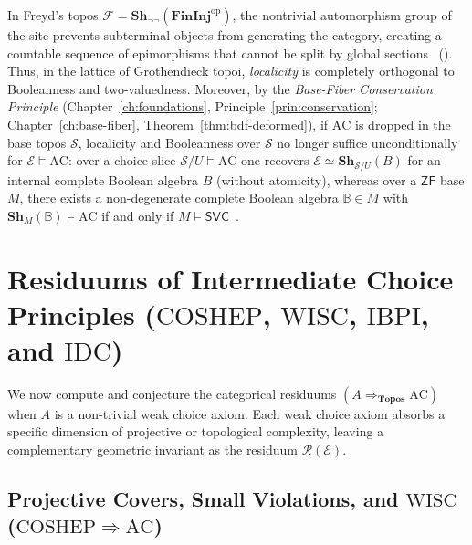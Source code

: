 In Freyd's topos $\mathcal{F} = \mathbf{Sh}_{\neg\neg}(\mathbf{FinInj}^{\mathrm{op}})$, the nontrivial automorphism group of the site prevents subterminal objects from generating the category, creating a countable sequence of epimorphisms that cannot be split by global sections~\cite{Freyd72} (\cite[\S D4.5]{Johnstone02}). Thus, in the lattice of Grothendieck topoi, \emph{localicity} is completely orthogonal to Booleanness and two-valuedness. Moreover, by the \emph{Base-Fiber Conservation Principle} (Chapter~\ref{ch:foundations}, Principle~\ref{prin:conservation}; Chapter~\ref{ch:base-fiber}, Theorem~\ref{thm:bdf-deformed}), if $\mathrm{AC}$ is dropped in the base topos $\mathcal{S}$, localicity and Booleanness over $\mathcal{S}$ no longer suffice unconditionally for $\mathcal{E} \models \mathrm{AC}$: over a choice slice $\mathcal{S}/U \models \mathrm{AC}$ one recovers $\mathcal{E} \simeq \mathbf{Sh}_{\mathcal{S}/U}(B)$ for an internal complete Boolean algebra $B$ (without atomicity), whereas over a $\mathsf{ZF}$ base $M$, there exists a non-degenerate complete Boolean algebra $\mathbb{B} \in M$ with $\mathbf{Sh}_M(\mathbb{B}) \models \mathrm{AC}$ if and only if $M \models \mathsf{SVC}$~\cite{Blass79,Usuba21}.

\section{Residuums of Intermediate Choice Principles ($\mathrm{COSHEP}$, $\mathrm{WISC}$, $\mathrm{IBPI}$, and $\mathrm{IDC}$)}

We now compute and conjecture the categorical residuums $(A \Rightarrow_{\mathbf{Topos}} \mathrm{AC})$ when $A$ is a non-trivial weak choice axiom. Each weak choice axiom absorbs a specific dimension of projective or topological complexity, leaving a complementary geometric invariant as the residuum $\mathcal{R}(\mathcal{E})$.

\subsection{Projective Covers, Small Violations, and $\mathrm{WISC}$ ($\mathrm{COSHEP} \Rightarrow \mathrm{AC}$)}

